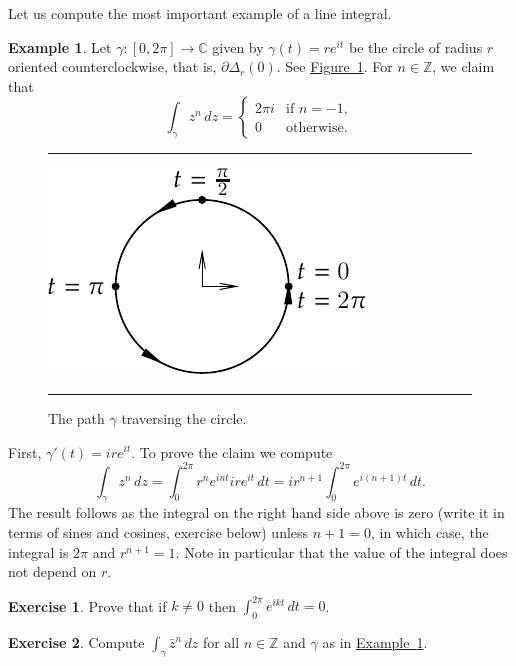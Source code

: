 \documentclass[12pt,openany]{book}
\newcommand{\C}{{\mathbb{C}}}
\newcommand{\Z}{{\mathbb{Z}}}
\theoremstyle{plain}
\theoremstyle{remark}
\theoremstyle{definition}
\newenvironment{exbox}{%
    \def\FrameCommand{\vrule width 1pt \relax\hspace {10pt}}%
    \MakeFramed {\advance \hsize -\width \FrameRestore }%
}{%
    \endMakeFramed
}
\newenvironment{myfig}{%
\begin{figure}[h!t]
\noindent\rule{\textwidth}{0.4pt}\vspace{12pt}\par\centering}%
{\par\noindent\rule{\textwidth}{0.4pt}
\end{figure}}
\theoremstyle{exercise}
\newtheorem{exercise}{Exercise}[section]
\theoremstyle{example}
\newtheorem{example}[thm]{Example}
\newcommand{\figureref}[1]{\hyperref[#1]{Figure~\ref*{#1}}}
\newcommand{\exampleref}[1]{\hyperref[#1]{Example~\ref*{#1}}}
\begin{document}
Let us compute the most important example of a line integral.

\begin{example} \label{example:integralpowerz}
Let $\gamma \colon [0,2\pi] \to \C$ given by $\gamma(t) = r e^{it}$ be
the circle of radius $r$ oriented counterclockwise,
that is, $\partial \Delta_r(0)$.  See \figureref{fig:circlepath}.
For $n \in \Z$, we claim that
\begin{equation*}
\int_\gamma z^n \, dz
=
\begin{cases}
2\pi i & \text{if } n=-1, \\
0 & \text{otherwise.}
\end{cases}
\end{equation*}

\begin{myfig}
\includegraphics{figures/circlepath}
\caption{The path $\gamma$ traversing the circle.\label{fig:circlepath}}
\end{myfig}

First, $\gamma'(t) = i r e^{it}$.
To prove the claim we compute
\begin{equation*}
\int_\gamma z^n \, dz
=
\int_0^{2\pi}
r^n
e^{int} i r e^{it} \, dt
=
i r^{n+1}
\int_0^{2\pi}
e^{i(n+1)t} \, dt .
\end{equation*}
The result follows as the integral on the right hand side above is zero
(write it in terms of sines and cosines, exercise below) unless $n+1 = 0$,
in which case, the integral 
is $2\pi$ and $r^{n+1} = 1$.  Note in particular that the value of the
integral does not depend on $r$.
\end{example}

\begin{exbox}
\begin{exercise}
Prove that if $k\not= 0$ then $\int_0^{2\pi} e^{ik t} \, dt = 0$.
\end{exercise}

\begin{exercise}
Compute $\int_\gamma \bar{z}^n \, dz$ for all $n \in \Z$ and $\gamma$ as in
\exampleref{example:integralpowerz}.
\end{exercise}
\end{exbox}
\end{document}
